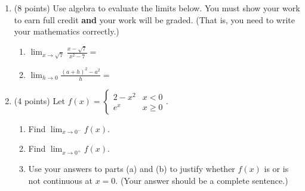 \documentclass[12pt]{article}
\renewcommand{\emph}[1]{\textsf{\textbf{#1}}}
\renewcommand{\d}{\displaystyle}
\begin{document}
\begin{enumerate}
\item (8 points) Use algebra to evaluate the limits below. You must show your work to earn full credit \emph{and} your work will be graded. (That is, you need to write your mathematics correctly.)
	\begin{enumerate}
	\item $\d \lim_{x \to \sqrt{7}} \frac{x-\sqrt{7}}{x^2-7}=$
	\vfill
	\item $\d \lim_{h \to 0} \frac{(a+h)^2-a^2}{h}=$
	\vfill
	\end{enumerate}
\item (4 points) Let $f(x)=\begin{cases} 2-x^2 & x < 0\\e^x & x \geq 0 \end{cases}.$ 
\begin{enumerate}
	\item Find $\d \lim_{x \to 0^-} f(x).$
	\vspace{.7in}
	\item Find $\d \lim_{x \to 0^+} f(x).$
	\vspace{.7in}
	\item Use your answers to parts (a) and (b) to justify whether $f(x)$ is or is not continuous at $x=0.$ (Your answer should be a complete sentence.)
	\vspace{.7in}
\end{enumerate}
\end{enumerate}
\end{document}
